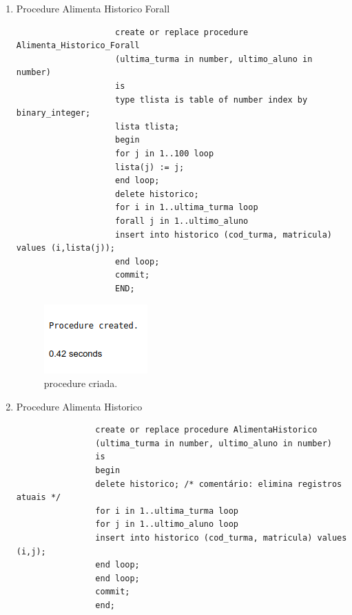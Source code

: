 \documentclass[
article,			%
11pt,				%
oneside,			%
a4paper,			%
english,			%
brazil,				%
sumario=tradicional
]{abntex2}
\begin{document}
	
	\frenchspacing 
	
	
	\maketitle
	\begin{enumerate}
		\item Procedure Alimenta Historico Forall
				\begin{verbatim}
					create or replace procedure Alimenta_Historico_Forall
					(ultima_turma in number, ultimo_aluno in number)
					is
					type tlista is table of number index by binary_integer;
					lista tlista;
					begin
					for j in 1..100 loop
					lista(j) := j;
					end loop;
					delete historico;
					for i in 1..ultima_turma loop
					forall j in 1..ultimo_aluno
					insert into historico (cod_turma, matricula) values (i,lista(j));
					end loop;
					commit;
					END;
				\end{verbatim}
				
				\begin{center}
					\begin{figure}[H]
						\centering
						\includegraphics[scale=0.5]{./imagens/01.png}
						\caption{procedure criada.}
						\label{rota-1}
					\end{figure}
				\end{center}
		
			\item Procedure Alimenta Historico
				\begin{verbatim}
				create or replace procedure AlimentaHistorico
				(ultima_turma in number, ultimo_aluno in number)
				is
				begin
				delete historico; /* comentário: elimina registros atuais */
				for i in 1..ultima_turma loop
				for j in 1..ultimo_aluno loop
				insert into historico (cod_turma, matricula) values (i,j);
				end loop;
				end loop;
				commit;
				end;
				\end{verbatim}
				

\end{enumerate}
\end{document}
